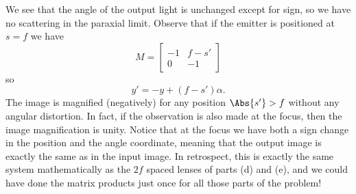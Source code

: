 {\begin{enumerate}
\begin{dmath}
\end{dmath}
%
We see that the angle of the output light is unchanged except for sign, so we have no scattering in the paraxial limit.  Observe that if the emitter is positioned at \(s = f\) we have
%
\begin{dmath}\label{eqn:modernOpticsProblemSet1P1:1750}
M =
\begin{bmatrix}
-1 & f - s' \\
0 & -1
\end{bmatrix}
\end{dmath}
%
so
%
\begin{dmath}\label{eqn:modernOpticsProblemSet1P1:1770}
y' = -y + (f -s') \alpha.
\end{dmath}
%
The image is magnified (negatively) for any position \(\Abs{s'} > f\) without any angular distortion.  In fact, if the observation is also made at the focus, then the image magnification is unity.  Notice that at the focus we have both a sign change in the position and the angle coordinate, meaning that the output image is exactly the same as in the input image.  In retrospect, this is exactly the same system mathematically as the \(2f\) spaced lenses of parts (d) and (e), and we could have done the matrix products just once for all those parts of the problem!

\end{enumerate}
} %

